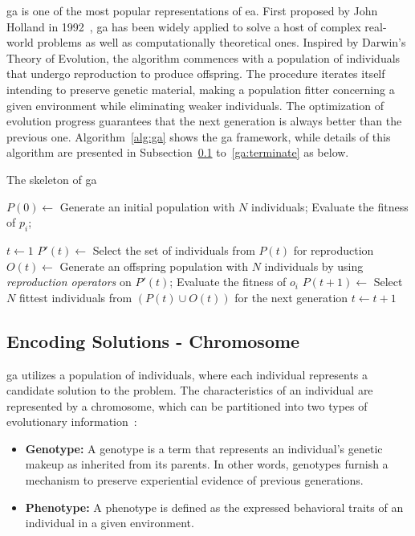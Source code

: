 \acrfull{ga} is one of the most popular representations of \gls{ea}. First proposed by John Holland in 1992~\cite{holland1992genetic}, \gls{ga} has been widely applied to solve a host of complex real-world problems as well as computationally theoretical ones. Inspired by Darwin's Theory of Evolution, the algorithm commences with a population of individuals that undergo reproduction to produce offspring. The procedure iterates itself intending to preserve genetic material, making a population fitter concerning a given environment while eliminating weaker individuals. The optimization of evolution progress guarantees that the next generation is always better than the previous one. Algorithm~\ref{alg:ga} shows the \gls{ga} framework, while details of this algorithm are presented in Subsection~\ref{ga:encoding} to~\ref{ga:terminate} as below.

\begin{algorithm}
	\caption{The skeleton of \gls{ga}}
	\label{alg:ga}
	\BlankLine
	\Begin
	{	
		$P(0) \leftarrow$ Generate an initial population with $N$ individuals; \;
		{
			Evaluate the fitness of $p_i$; \;
		} 
		
		$t \leftarrow 1$\;
		{
			$P'(t) \leftarrow$ Select the set of individuals from $P(t)$ for reproduction \;
			$O(t) \leftarrow$ Generate an offspring population with $N$ individuals by using \emph{reproduction operators} on $P'(t)$; \;
			{
				Evaluate the fitness of $o_i$\;
			} 
			$P(t+1) \leftarrow$ Select $N$ fittest individuals from $(P(t) \cup O(t))$ for the next generation\;
			$t \leftarrow t + 1$\;
		}
	}
\end{algorithm}

\subsection {Encoding Solutions - Chromosome}
\label{ga:encoding}
\gls{ga} utilizes a population of individuals, where each individual represents a candidate solution to the problem. The characteristics of an individual are represented by a chromosome, which can be partitioned into two types of evolutionary information~\cite{engelbrecht2007computational}: 
\begin{itemize}
	\item \textbf{Genotype:} A genotype is a term that represents an individual's genetic makeup as inherited from its parents. In other words, genotypes furnish a mechanism to preserve experiential evidence of previous generations.
	\item \textbf{Phenotype:} A phenotype is defined as the expressed behavioral traits of an individual in a given environment.
\end{itemize}

